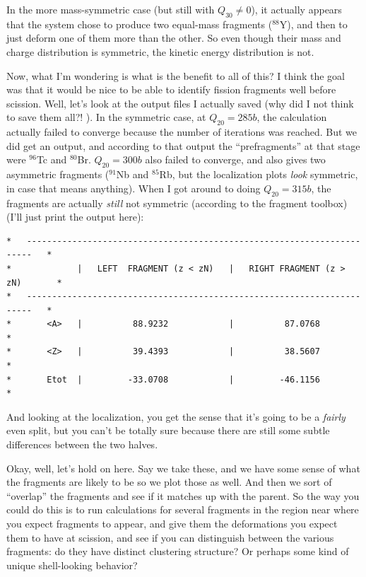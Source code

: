 \documentclass[]{report}
\begin{document}
In the more mass-symmetric case (but still with $Q_{30}\neq0$), it actually appears that the system chose to produce two equal-mass fragments ($^{88}$Y), and then to just deform one of them more than the other. So even though their mass and charge distribution is symmetric, the kinetic energy distribution is not.

Now, what I'm wondering is what is the benefit to all of this? I think the goal was that it would be nice to be able to identify fission fragments well before scission. Well, let's look at the output files I actually saved (why did I not think to save them all?! \frown). In the symmetric case, at $Q_{20}=285b$, the calculation actually failed to converge because the number of iterations was reached. But we did get an output, and according to that output the ``prefragments'' at that stage were $^{96}$Tc and $^{80}$Br. $Q_{20}=300b$ also failed to converge, and also gives two asymmetric fragments ($^{91}$Nb and $^{85}$Rb, but the localization plots \textit{look} symmetric, in case that means anything). When I got around to doing $Q_{20}=315b$, the fragments are actually \textit{still} not symmetric (according to the fragment toolbox) (I'll just print the output here):
\begin{verbatim}
*   -----------------------------------------------------------------------   *
*             |   LEFT  FRAGMENT (z < zN)   |   RIGHT FRAGMENT (z > zN)       *
*   -----------------------------------------------------------------------   *
*       <A>   |          88.9232            |          87.0768                *
*       <Z>   |          39.4393            |          38.5607                *
*       Etot  |         -33.0708            |         -46.1156                *
\end{verbatim}

\noindent And looking at the localization, you get the sense that it's going to be a \textit{fairly} even split, but you can't be totally sure because there are still some subtle differences between the two halves.

Okay, well, let's hold on here. Say we take these, and we have some sense of what the fragments are likely to be so we plot those as well. And then we sort of ``overlap'' the fragments and see if it matches up with the parent. So the way you could do this is to run calculations for several fragments in the region near where you expect fragments to appear, and give them the deformations you expect them to have at scission, and see if you can distinguish between the various fragments: do they have distinct clustering structure? Or perhaps some kind of unique shell-looking behavior?
\end{document}
